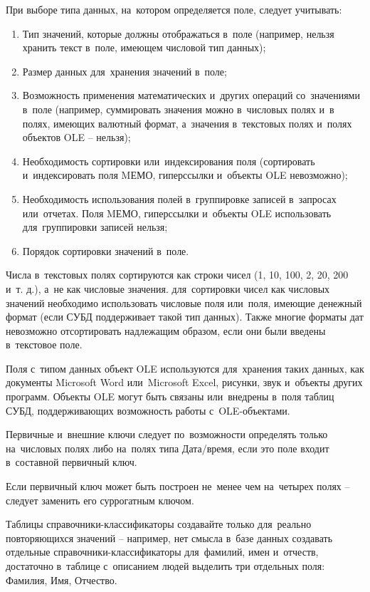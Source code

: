 \documentclass{ou}
\begin{document}
При выборе типа данных, на~котором определяется поле, следует учитывать:
\begin{enumerate}[leftmargin=0em, itemindent=3.75em, nosep, label=\arabic*)]
\item Тип значений, которые должны отображаться в~поле (например, нельзя хранить текст в~поле, имеющем числовой тип данных);
\item Размер данных для~хранения значений в~поле;
\item Возможность применения математических и~других операций со~значениями в~поле (например, суммировать значения можно в~числовых полях и~в полях, имеющих валютный формат, а~значения в~текстовых полях и~полях объектов OLE -- нельзя);
\item Необходимость сортировки или~индексирования поля (сортировать и~индексировать поля MЕМО, гиперссылки и~объекты OLE невозможно);
\item Необходимость использования полей в~группировке записей в~запросах или~отчетах. Поля MЕМО, гиперссылки и~объекты OLE использовать для~группировки записей нельзя;
\item Порядок сортировки значений в~поле.
\end{enumerate}

Числа в~текстовых полях сортируются как строки чисел (1, 10, 100, 2, 20, 200 и~т. д.), а~не как числовые значения. для~сортировки чисел как числовых значений необходимо использовать числовые поля или~поля, имеющие денежный формат (если СУБД поддерживает такой тип данных). Также многие форматы дат невозможно отсортировать надлежащим образом, если они были введены в~текстовое поле\cite{Elmudurov2023}.

Поля с~типом данных объект OLE используются для~хранения таких данных, как документы Microsoft Word или~Microsoft Excel, рисунки, звук и~объекты других программ. Объекты OLE могут быть связаны или~внедрены в~поля таблиц СУБД, поддерживающих возможность работы с~OLE-объектами\cite{Senchenko2015}.

Первичные и~внешние ключи следует по~возможности определять только на~числовых полях либо на~полях типа Дата/время, если это поле входит в~составной первичный ключ.

Если первичный ключ может быть построен не~менее чем на~четырех полях -- следует заменить его суррогатным ключом.

Таблицы справочники-классификаторы создавайте только для~реально повторяющихся значений -- например, нет смысла в~базе данных создавать отдельные справочники-классификаторы для~фамилий, имен и~отчеств, достаточно в~таблице с~описанием людей выделить три отдельных поля: Фамилия, Имя, Отчество.
\end{document}
